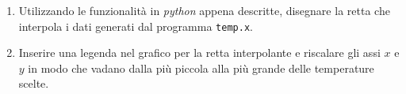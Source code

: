 \documentclass[11pt]{article}
\begin{document}
\begin{enumerate}
  \item Utilizzando le funzionalit\`a in {\it python} appena descritte, disegnare la retta che interpola i dati generati dal programma \texttt{temp.x}.
\item 
  Inserire una legenda nel grafico per la retta interpolante e riscalare gli assi $x$ e $y$ in modo che vadano dalla pi\`u piccola alla pi\`u grande delle temperature scelte. 
\end{enumerate}  
\end{document}
